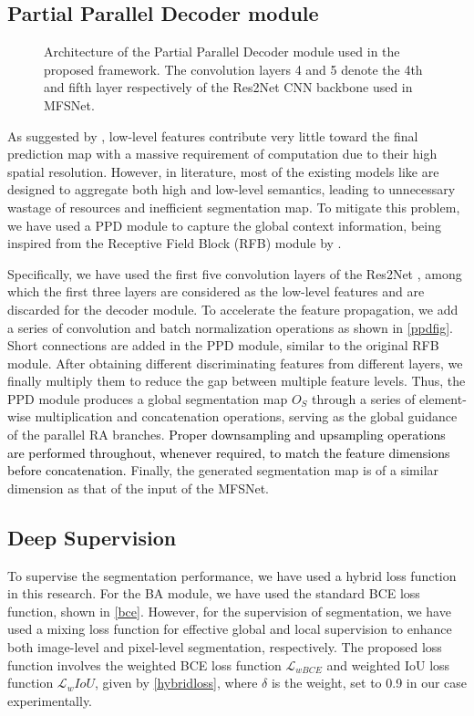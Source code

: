 \documentclass[review]{elsarticle}
\begin{document}
\subsection{Partial Parallel Decoder module}\label{PPD}
\begin{figure*}
\centering
    \caption{Architecture of the Partial Parallel Decoder module used in the proposed framework. The convolution layers 4 and 5 denote the 4th and fifth layer respectively of the Res2Net CNN backbone used in MFSNet.}
    \label{ppdfig}
\end{figure*}

As suggested by \cite{wu2019cascaded}, low-level features contribute very little toward the final prediction map with a massive requirement of computation due to their high spatial resolution. However, in literature, most of the existing models like \cite{zhou2018unet++,gu2019net} are designed to aggregate both high and low-level semantics, leading to unnecessary wastage of resources and inefficient segmentation map. To mitigate this problem, we have used a PPD module to capture the global context information, being inspired from the Receptive Field Block (RFB) module by \cite{liu2018receptive}. 

Specifically, we have used the first five convolution layers of the Res2Net \cite{gao2019res2net}, among which the first three layers are considered as the low-level features and are discarded for the decoder module. To accelerate the feature propagation, we add a series of convolution and batch normalization operations as shown in \autoref{ppdfig}. Short connections are added in the PPD module, similar to the original RFB module. After obtaining different discriminating features from different layers, we finally multiply them to reduce the gap between multiple feature levels. Thus, the PPD module produces a global segmentation map $O_S$ through a series of element-wise multiplication and concatenation operations, serving as the global guidance of the parallel RA branches. \textcolor{black}{Proper downsampling and upsampling operations are performed throughout, whenever required, to match the feature dimensions before concatenation.} Finally, the generated segmentation map is of a similar dimension as that of the input of the MFSNet.

\subsection{Deep Supervision}\label{loss}
To supervise the segmentation performance, we have used a hybrid loss function in this research. For the BA module, we have used the standard BCE loss function, shown in \autoref{bce}. However, for the supervision of segmentation, we have used a mixing loss function for effective global and local supervision to enhance both image-level and pixel-level segmentation, respectively. The proposed loss function involves the weighted BCE loss function $\mathcal{L}_{wBCE}$ and weighted IoU loss function $\mathcal{L}_wIoU$, given by \autoref{hybridloss}, where $\delta$ is the weight, set to 0.9 in our case experimentally.
\end{document}
